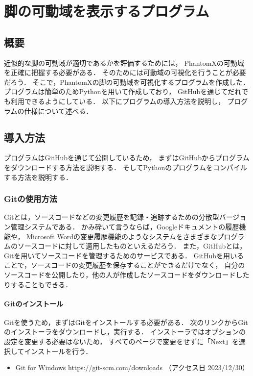 ﻿

\chapter{脚の可動域を表示するプログラム}\label{chapter:leg_range_python}

\section{概要}
近似的な脚の可動域が適切であるかを評価するためには，
PhantomXの可動域を正確に把握する必要がある．
そのためには可動域の可視化を行うことが必要だろう．
そこで，PhantomXの脚の可動域を可視化するプログラムを作成した．
プログラムは簡単のためPythonを用いて作成しており，
GitHubを通じてだれでも利用できるようにしている．
以下にプログラムの導入方法を説明し，
プログラムの仕様について述べる．

\section{導入方法}
プログラムはGitHubを通じて公開しているため，
まずはGitHubからプログラムをダウンロードする方法を説明する．
そしてPythonのプログラムをコンパイルする方法を説明する．

\subsection{Gitの使用方法}
Gitとは，ソースコードなどの変更履歴を記録・追跡するための分散型バージョン管理システムである．
かみ砕いて言うならば，Googleドキュメントの履歴機能や，
Microsoft Wordの変更履歴機能のようなシステムをさまざまなプログラムのソースコードに対して適用したものといえるだろう．
また，GitHubとは，Gitを用いてソースコードを管理するためのサービスである．
GitHubを用いることで，ソースコードの変更履歴を保存することができるだけでなく，
自分のソースコードを公開したり，他の人が作成したソースコードをダウンロードしたりすることもできる．

\subsubsection{Gitのインストール}
Gitを使うため，まずはGitをインストールする必要がある．
次のリンクからGitのインストーラをダウンロードし，実行する．
インストーラではオプションの設定を変更する必要はないため，
すべてのページで変更をせずに「Next」を選択してインストールを行う．

\begin{itemize}
  \item Git for Windows https://git-scm.com/downloads （アクセス日 2023/12/30）
\end{itemize}

